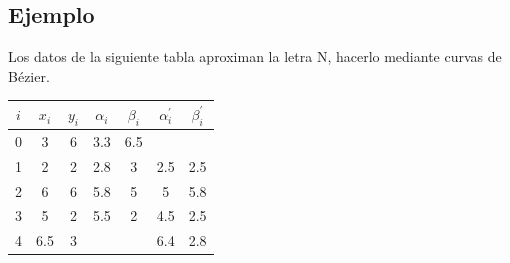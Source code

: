 \documentclass[12pt,a4paper,oneside]{scrbook}
\begin{document}
\subsection*{Ejemplo}
Los datos de la siguiente tabla aproximan la letra N, hacerlo mediante curvas de Bézier.
\begin{center}
    \begin{tabular}{|c||c|c|c|c|c|c|}
        \hline
        $i$ & $x_i$ & $y_i$ & $\alpha_i$ & $\beta_i$ & $\alpha^\prime _i$ & $\beta^\prime _i$ \\ \hline\hline
        0 & 3 & 6 & 3.3 & 6.5 & &  \\ \hline
        1 & 2 & 2 & 2.8 & 3 & 2.5 & 2.5 \\ \hline
        2 & 6 & 6 & 5.8 & 5 & 5 & 5.8\\ \hline
        3 & 5 & 2 & 5.5 & 2 & 4.5 & 2.5\\ \hline
        4 & 6.5 & 3 &  &  & 6.4 & 2.8\\ \hline
    \end{tabular}
\end{center}
\end{document}
